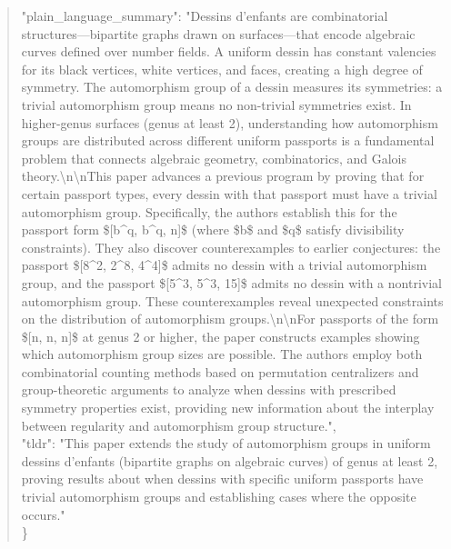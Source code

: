 \documentclass[11pt]{article}
\begin{document}
\begin{quote}
  "plain\_language\_summary": "Dessins d'enfants are combinatorial structures---bipartite graphs drawn on surfaces---that encode algebraic curves defined over number fields. A uniform dessin has constant valencies for its black vertices, white vertices, and faces, creating a high degree of symmetry. The automorphism group of a dessin measures its symmetries: a trivial automorphism group means no non-trivial symmetries exist. In higher-genus surfaces (genus at least 2), understanding how automorphism groups are distributed across different uniform passports is a fundamental problem that connects algebraic geometry, combinatorics, and Galois theory.\textbackslash{}n\textbackslash{}nThis paper advances a previous program by proving that for certain passport types, every dessin with that passport must have a trivial automorphism group. Specifically, the authors establish this for the passport form \$[b\^{}q, b\^{}q, n]\$ (where \$b\$ and \$q\$ satisfy divisibility constraints). They also discover counterexamples to earlier conjectures: the passport \$[8\^{}2, 2\^{}8, 4\^{}4]\$ admits no dessin with a trivial automorphism group, and the passport \$[5\^{}3, 5\^{}3, 15]\$ admits no dessin with a nontrivial automorphism group. These counterexamples reveal unexpected constraints on the distribution of automorphism groups.\textbackslash{}n\textbackslash{}nFor passports of the form \$[n, n, n]\$ at genus 2 or higher, the paper constructs examples showing which automorphism group sizes are possible. The authors employ both combinatorial counting methods based on permutation centralizers and group-theoretic arguments to analyze when dessins with prescribed symmetry properties exist, providing new information about the interplay between regularity and automorphism group structure.",\\
  "tldr": "This paper extends the study of automorphism groups in uniform dessins d'enfants (bipartite graphs on algebraic curves) of genus at least 2, proving results about when dessins with specific uniform passports have trivial automorphism groups and establishing cases where the opposite occurs."\\
\}\\
\end{quote}
\end{document}
